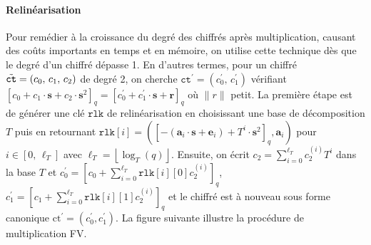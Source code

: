 \documentclass[11pt, headsepline, a4paper, fleqn, oneside]{article}
\begin{document}
\paragraph{Relinéarisation} Pour remédier à la croissance du degré des chiffrés après multiplication, causant des coûts importants en temps et en mémoire, on utilise cette technique dès que le degré d'un chiffré dépasse 1. En d'autres termes, pour un chiffré $\Tilde{\texttt{ct}} = (c_0 ,\, c_1 ,\, c_2 )$ de degré 2, on cherche $\texttt{ct}^{\prime} = (c_0 ^\prime ,\, c_1 ^\prime )$ vérifiant $ \left[ c_0 +c_1 \cdot\boldsymbol{s} + c_2 \cdot\boldsymbol{s}^2\right]_{q} = \left[ c_0 ^\prime +c_1 ^\prime \cdot\boldsymbol{s} + \boldsymbol{r}\right]_{q}$ où $\|r\|$ petit. La première étape est de générer une clé $\texttt{rlk}$ de relinéarisation en choisissant une base de décomposition $T$ puis en retournant $\texttt{rlk}[i]=(\left[-\left(\mathbf{a}_{i}\cdot\mathbf{s}+\mathbf{e}_{i}\right)+T^{i} \cdot\mathbf{s}^{2}\right]_{q}, \mathbf{a}_{i} )$ pour $i\in [0,\,\ell_T ]$ avec $\ell_{T}=\left\lfloor\log _{T}(q)\right\rfloor$. Ensuite, on écrit $c_{2}=\sum_{i=0}^{\ell_T} c_{2}^{(i)} T^{i}$ dans la base $T$ et  $c_{0}^{\prime}=[c_{0}+\sum_{i=0}^{\ell_T} \texttt{rlk}[i][0] c_{2}^{(i)}]_q$, $c_{1}^{\prime}=[c_{1}+\sum_{i=0}^{\ell_T} \texttt{rlk}[i][1] c_{2}^{(i)}]_q$ et le chiffré est à nouveau sous forme canonique $\mathrm{ct}^{\prime}=\left(c_{0}^{\prime}, c_{1}^{\prime}\right)$.
La figure suivante illustre la procédure de multiplication FV.
\end{document}
